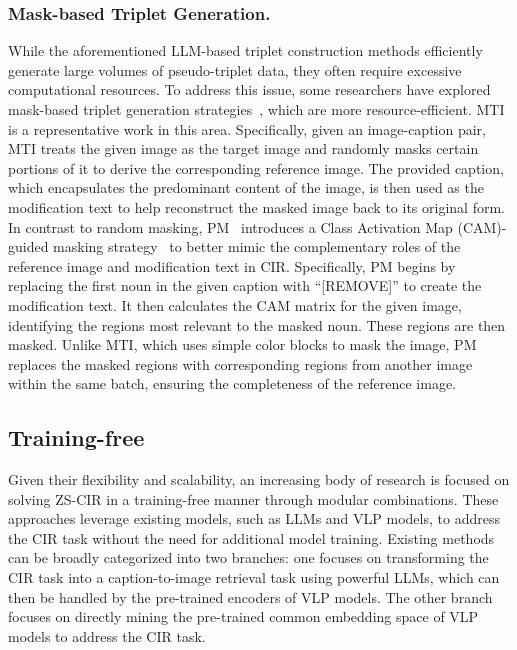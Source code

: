\subsubsection{Mask-based Triplet Generation.}
While the aforementioned LLM-based triplet construction methods efficiently generate large volumes of pseudo-triplet data, they often require excessive computational resources. To address this issue, some researchers have explored mask-based triplet generation strategies~\cite{mti, pm}, which are more resource-efficient. MTI~\cite{mti} is a representative work in this area. Specifically, given an image-caption pair, MTI treats the given image as the target image and randomly masks certain portions of it to derive the corresponding reference image. The provided caption, which encapsulates the predominant content of the image, is then used as the modification text to help reconstruct the masked image back to its original form. In contrast to random masking, PM~\cite{pm} introduces a Class Activation Map (CAM)-guided masking strategy~\cite{chefer2021generic} to better mimic the complementary roles of the reference image and modification text in CIR. Specifically, PM begins by replacing the first noun in the given caption with ``[REMOVE]'' to create the modification text. It then calculates the CAM matrix for the given image, identifying the regions most relevant to the masked noun. These regions are then masked. Unlike MTI, which uses simple color blocks to mask the image, PM replaces the masked regions with corresponding regions from another image within the same batch, ensuring the completeness of the reference image.

\subsection{Training-free}
Given their flexibility and scalability, an increasing body of research is focused on solving ZS-CIR in a training-free manner through modular combinations. These approaches leverage existing models, such as LLMs and VLP models, to address the CIR task without the need for additional model training. Existing methods can be broadly categorized into two branches: one focuses on transforming the CIR task into a caption-to-image retrieval task using powerful LLMs, which can then be handled by the pre-trained encoders of VLP models. The other branch focuses on directly mining the pre-trained common embedding space of VLP models to address the CIR task.

